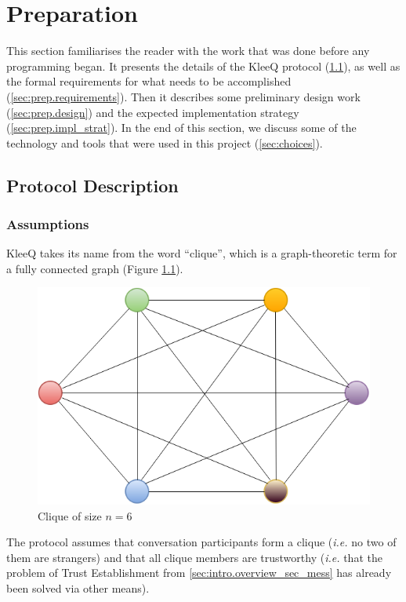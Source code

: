 \documentclass[a4paper, 12pt]{report}
\begin{document}
\chapter{Preparation}
\label{ch:prep}
This section familiarises the reader with the work that was done before any programming began. It presents the details of the KleeQ protocol (\cref{sec:prep.proto}), as well as the formal requirements for what needs to be accomplished (\cref{sec:prep.requirements}). Then it describes some preliminary design work (\cref{sec:prep.design}) and the expected implementation strategy (\cref{sec:prep.impl_strat}). In the end of this section, we discuss some of the technology and tools that were used in this project (\cref{sec:choices}).

\section{Protocol Description}
\label{sec:prep.proto}

\subsection{Assumptions}
KleeQ takes its name from the word ``clique'', which is a graph-theoretic term for a fully connected graph (Figure \ref{fig:clique}).
\begin{figure}[h]
    \centering
    \includegraphics[scale = 0.5]{pics/clique.png}
    \caption{Clique of size $n = 6$ \label{fig:clique}}
\end{figure}
The protocol assumes that conversation participants form a clique (\textit{i.e.} no two of them are strangers) and that all clique members are trustworthy (\textit{i.e.} that the problem of Trust Establishment from \cref{sec:intro.overview_sec_mess} has already been solved via other means). 
\end{document}
